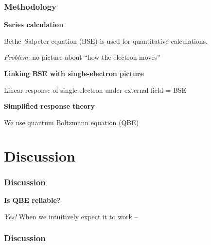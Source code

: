 \documentclass{beamer}
\begin{document}
\begin{frame}
\frametitle{Methodology}

\textbf{Series calculation} 

Bethe–Salpeter equation (BSE) is used for quantitative calculations. 

\emph{Problem}: no picture about ``how the electron moves''

\vspace{0.5cm}

\textbf{Linking BSE with single-electron picture}

Linear response of single-electron under external field = BSE

\vspace{0.5cm}

\textbf{Simplified response theory}

We use quantum Boltzmann equation (QBE)



\end{frame}

\section{Discussion}

\begin{frame}
\frametitle{Discussion}

\textbf{Is QBE reliable?}

\emph{Yes!} When we intuitively expect it to work --

\begin{center}
    
\end{center}

\end{frame}

\begin{frame}
\frametitle{Discussion}



\end{frame}
\end{document}
